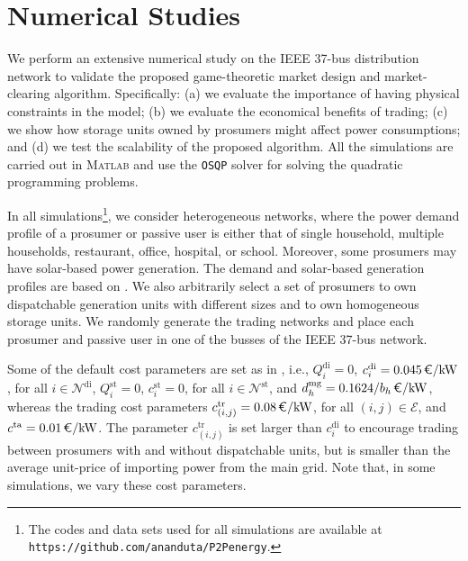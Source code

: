 \documentclass{IEEEtran}  %
\newcommand{\mc}{\mathcal}
\newcommand{\0}{\mathbf{0}}
\newcommand{\1}{\mathbf{1}}
\begin{document}
\section{Numerical Studies}
\label{sub:case_std}
We perform an extensive numerical study on the IEEE 37-bus distribution network to validate the proposed game-theoretic market design and market-clearing algorithm. Specifically: (a) we evaluate the importance of having physical constraints in the model; (b) we evaluate the economical benefits of trading;  (c) we show how storage units owned by prosumers might affect power consumptions; and (d) we test the scalability of the proposed algorithm. All the simulations are carried out in \textsc{Matlab} and use the \texttt{OSQP} solver \cite{osqp} for solving the quadratic programming problems. 

In all simulations\footnote{The codes and data sets used for all simulations are available at \texttt{https://github.com/ananduta/P2Penergy}.}, we consider heterogeneous networks, where the power demand profile of a prosumer or passive user is either that of single household, multiple households, restaurant, office, hospital, or school. Moreover, some prosumers may have solar-based power generation. The demand and solar-based generation profiles are based on \cite{jasm}.
%
We also arbitrarily select a set of prosumers to own dispatchable generation units with different sizes and to own homogeneous storage units. We randomly generate the trading networks and place each prosumer and passive user in one of the busses of the IEEE 37-bus network. 

Some of the default cost parameters are set as in \cite{atzeni2013}, i.e., $Q_i^{\mathrm{di}}=0$, $c_i^{\mathrm{di}}=0.045\,  \text{\euro/kW}$, for all $i \in \mc N^{\mathrm{di}}$, $Q_i^{\mathrm{st}}=0$, $c_i^{\mathrm{st}}=0$, for all $i \in \mc N^{\mathrm{st}}$, and $d_h^{\mathrm{mg}}=0.1624/b_h \, \text{\euro/kW}$, whereas the trading cost parameters $c_{(i,j)}^{\mathrm{tr}}=0.08 \,  \text{\euro/kW}$, for all $(i,j) \in \mc E$, and $c^{\mathrm{ta}}=0.01 \,  \text{\euro/kW}$. The parameter $c_{(i,j)}^{\mathrm{tr}}$ is set larger than $c_i^{\mathrm{di}}$ to encourage trading between prosumers with and without dispatchable units, but is smaller than the average unit-price of importing power from the main grid. Note that, in some simulations, we vary these cost parameters. 
%
%
\end{document}
